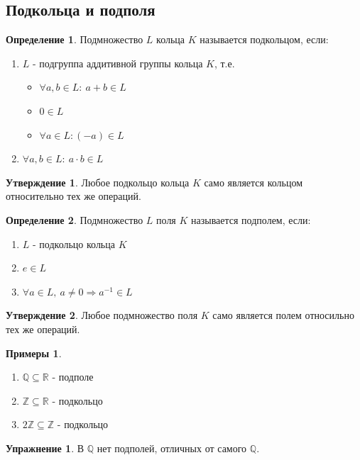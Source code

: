 \documentclass[a4paper, 12pt]{article}
\newcommand{\R}{\mathbb R}
\newcommand{\Q}{\mathbb Q}
\newcommand{\Z}{\mathbb Z}
\newcommand\tab[1][.5cm]{\hspace*{#1}}
\theoremstyle{definition}
\newtheorem*{definition}{Определение}
\newtheorem*{subtheorem}{Утверждение}
\newtheorem*{example}{Примеры}
\newtheorem*{Exercise}{Упражнение}
\begin{document}
  \subsection{Подкольца и подполя}
  \begin{definition}
    Подмножество $L$ кольца $K$ называется подкольцом, если:
    \begin{enumerate}
      \item $L$ - подгруппа аддитивной группы кольца $K$, т.е.
      \begin{itemize}
        \item $\forall a, b \in L : \ a + b \in L$ 
        \item $0 \in L$ 
        \item $\forall a \in L: (-a) \in L$
      \end{itemize}
      \item $\forall a, b \in L: \ a \cdot b \in L$    
    \end{enumerate}
  \end{definition} 
  \begin{subtheorem}
    Любое подкольцо кольца $K$ само является кольцом относительно тех же операций.  
  \end{subtheorem}
  \begin{definition}
    Подмножество $L$ поля $K$ называется подполем, если:
    \begin{enumerate}
      \item $L$ - подкольцо кольца $K$
      \item $e \in L$
      \item $\forall a \in L, \ a \neq 0 \Longrightarrow a^{-1} \in L$   
    \end{enumerate}
  \end{definition}
  \begin{subtheorem}
    Любое подмножество поля $K$ само является полем относильно тех же операций.  
  \end{subtheorem}  
  \begin{example} \tab
    \begin{enumerate}
      \item $\Q \subseteq \R$ - подполе
      \item $\Z \subseteq \R$ - подкольцо
      \item $2\Z \subseteq \Z$ - подкольцо
    \end{enumerate}
  \end{example} 
  \begin{Exercise}
    В $\Q$ нет подполей, отличных от самого $\Q$.
  \end{Exercise}
\end{document}

